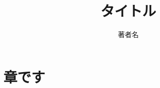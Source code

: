 \documentclass[uplatex,a4paper,11pt,oneside,report]{jsbook}
\begin{document}
\title{タイトル}
\author{著者名}
\maketitle

\tableofcontents

\chapter{章です}
	
\end{document}
